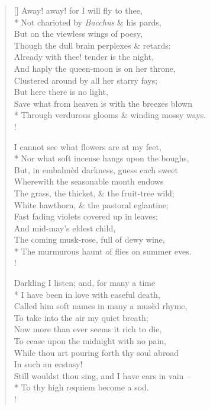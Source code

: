 \documentclass[MAIN]{subfiles}
\begin{document}
\begin{verse}[\versewidth]
Away! away! for I will fly to thee,\\*
\vin Not charioted by \emph{Bacchus} \& his pards,\\
But on the viewless wings of poesy,\\
\vin Though the dull brain perplexes \& retards:\\
Already with thee! tender is the night,\\
\vin And haply the queen-moon is on her throne,\\
\vin \vin Clustered around by all her starry fays;\\
\vin \vin \vin \vin But here there is no light,\\
\vin Save what from heaven is with the breezes blown\\*
\vin \vin Through verdurous glooms \& winding mossy ways.\\!

I cannot see what flowers are at my feet,\\*
\vin Nor what soft incense hangs upon the boughs,\\
But, in embalm\`ed darkness, guess each sweet\\
\vin Wherewith the seasonable month endows\\
The grass, the thicket, \& the fruit-tree wild;\\
\vin White hawthorn, \& the pastoral eglantine;\\
\vin \vin Fast fading violets covered up in leaves;\\
\vin \vin \vin \vin And mid-may's eldest child,\\
\vin The coming musk-rose, full of dewy wine,\\*
\vin \vin The murmurous haunt of flies on summer eves.\\!

Darkling I listen; and, for many a time\\*
\vin I have been  in love with easeful death,\\
Called him soft names in many a mus\`ed rhyme,\\
\vin To take into the air my quiet breath;\\
Now more than ever seems it rich to die,\\
\vin To cease upon the midnight with no pain,\\
\vin \vin While thou art pouring forth thy soul abroad\\
\vin \vin \vin \vin In such an ecstasy!\\
\vin Still wouldst thou sing, and I have ears in vain --\\*
\vin \vin To thy high requiem become a sod.\\!


\end{verse}
\end{document}
